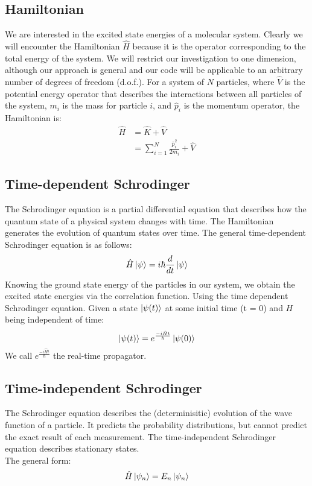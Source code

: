 \documentclass[12pt,letterpaper,oneside,final,titlepage]{article}               %
\numberwithin{equation}{section} %
\newcommand{\emiHt}{e^{\frac{-i\hat{H}t}{\hbar}}}
\begin{document}
\newpage

\subsection{Hamiltonian}
We are interested in the excited state energies of a molecular system.
Clearly we will encounter the Hamiltonian $\hat{H}$ because it is the operator corresponding to the total energy of the system.
We will restrict our investigation to one dimension, although our approach is general and our code will be applicable
to an arbitrary number of degrees of freedom (d.o.f.).
For a system of $N$ particles, where $\hat{V}$ is the potential energy operator that describes the interactions between 
all particles of the system, $m_{i}$ is the mass for particle $i$, and $\hat{p}_{i}$ is the momentum operator, the Hamiltonian is:
\begin{align}
    \hat{H} &= \hat{K} + \hat{V}
    \\      &= \sum_{i=1}^{N}\frac{\hat{p}_{i}^2}{2m_{i}} + \hat{V}
\end{align}


\subsection{Time-dependent Schrodinger}
The Schrodinger equation is a partial differential equation that describes how the quantum state of a physical system changes with time. 
The Hamiltonian generates the evolution of quantum states over time. 
The general time-dependent Schrodinger equation is as follows:
\begin{equation}
    \hat{H}\ket{\psi} = i\hbar\frac{d}{dt}\ket{\psi}
\end{equation}
Knowing the ground state energy of the particles in our system, we obtain the excited state energies via the correlation function.
Using the time dependent Schrodinger equation.
Given a state $\ket{\psi(t)}$ at some initial time (t = 0) and $H$ being independent of time:
\begin{equation}
    \ket{\psi(t)} = \emiHt\ket{\psi(0)}
\end{equation}
We call $\emiHt$ the real-time propagator.


\subsection{Time-independent Schrodinger}
The Schrodinger equation describes the (determinisitic) evolution of the wave function of a particle.
It predicts the probability distributions, but cannot predict the exact result of each measurement.
The time-independent Schrodinger equation describes stationary states. \\
The general form:
\begin{equation}
    \hat{H}\ket{\psi_{n}} = E_{n}\ket{\psi_{n}}
\end{equation}
\end{document}
